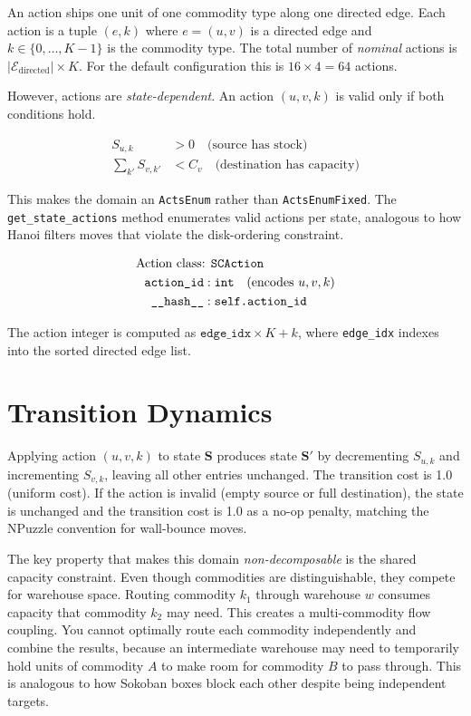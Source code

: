 \documentclass[11pt]{article}
\begin{document}
An action ships one unit of one commodity type along one directed edge. Each action is a tuple $(e, k)$ where $e = (u, v)$ is a directed edge and $k \in \{0, \ldots, K-1\}$ is the commodity type. The total number of \textit{nominal} actions is $|\mathcal{E}_{\text{directed}}| \times K$. For the default configuration this is $16 \times 4 = 64$ actions.

However, actions are \textit{state-dependent}. An action $(u, v, k)$ is valid only if both conditions hold.

\begin{align}
    S_{u,k} &> 0 \quad \text{(source has stock)} \\
    \sum_{k'} S_{v,k'} &< C_v \quad \text{(destination has capacity)}
\end{align}

This makes the domain an \texttt{ActsEnum} rather than \texttt{ActsEnumFixed}. The \texttt{get\_state\_actions} method enumerates valid actions per state, analogous to how Hanoi filters moves that violate the disk-ordering constraint.

\begin{align}
    \text{Action class: } & \texttt{SCAction} \notag \\
    \texttt{action\_id}: & \; \texttt{int} \quad (\text{encodes } u, v, k) \notag \\
    \texttt{\_\_hash\_\_}: & \; \texttt{self.action\_id} \notag
\end{align}

The action integer is computed as $\texttt{edge\_idx} \times K + k$, where \texttt{edge\_idx} indexes into the sorted directed edge list.

\section{Transition Dynamics}

Applying action $(u, v, k)$ to state $\mathbf{S}$ produces state $\mathbf{S}'$ by decrementing $S_{u,k}$ and incrementing $S_{v,k}$, leaving all other entries unchanged. The transition cost is 1.0 (uniform cost). If the action is invalid (empty source or full destination), the state is unchanged and the transition cost is 1.0 as a no-op penalty, matching the NPuzzle convention for wall-bounce moves.

The key property that makes this domain \textit{non-decomposable} is the shared capacity constraint. Even though commodities are distinguishable, they compete for warehouse space. Routing commodity $k_1$ through warehouse $w$ consumes capacity that commodity $k_2$ may need. This creates a multi-commodity flow coupling. You cannot optimally route each commodity independently and combine the results, because an intermediate warehouse may need to temporarily hold units of commodity $A$ to make room for commodity $B$ to pass through. This is analogous to how Sokoban boxes block each other despite being independent targets.
\end{document}
